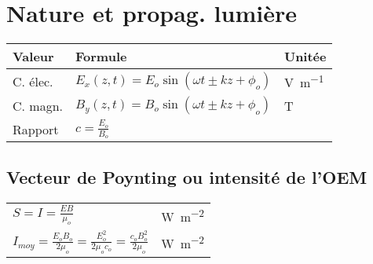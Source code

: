 \section{Nature et propag. lumière}
\vspace{-2\baselineskip}


\begin{tabular}{lll}
Valeur & Formule & Unitée \\\hline
C. élec. & \(E_x(z,t)=E_o\sin (\omega t \pm k z + \phi_o)\) & \si{\volt\per\meter} \\[3pt]
C. magn. & \(B_y(z,t)=B_o\sin (\omega t \pm k z +\phi_o)\) & \si{\tesla}\\[3pt]
Rapport & \(c=\frac{E_o}{B_o}\) &
\end{tabular}

\subsection{Vecteur de Poynting ou intensité de l'OEM}
\begin{tabular}{ll}
\(S=I=\frac{EB}{\mu_o}\) & \si{\watt\per\meter\squared}\\[8pt]
\(I_{\textit{moy}}=\frac{E_o B_o}{2\mu_o} = \frac{E_o^2}{2 \mu_o c_o}=\frac{c_o B_o^2}{2\mu_o}\) & \si{\watt\per\meter\squared}
\end{tabular}



